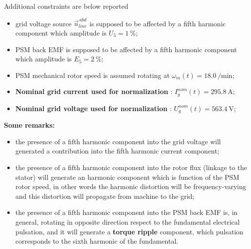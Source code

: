\documentclass[12pt,a4paper]{scrartcl}
\begin{document}
\begin{onehalfspace}
Additional constraints are below reported
\begin{itemize}
	\item[--] grid voltage source $\vec{u}_{line}^{\,abd}$ is supposed to be affected by a fifth harmonic component which amplitude is $U_{5}=\SI{1}{\percent}$;
	\item[--] PSM back EMF is supposed to be affected by a fifth harmonic component which amplitude is $E_{5}=\SI{2}{\percent}$;
	\item[--] PSM mechanical rotor speed is assumed rotating at $\omega_m(t) = \SI{18.0}{\per\minute}$;	
	\item[--] \textbf{Nominal grid current used for normalization} : $I_{g}^{nom}(t) = \SI{295.8}{\ampere}$;	
	\item[--] \textbf{Nominal grid voltage used for normalization} : $U_{g}^{nom}(t) = \SI{563.4}{\volt}$;	
\end{itemize} 

\noindent\textbf{Some remarks:}
\begin{itemize}
	\item[--] the presence of a fifth harmonic component into the grid voltage will generated a contribution into the fifth harmonic current component;
	\item[--] the presence of a fifth harmonic component into the rotor flux (linkage to the stator) will generate an harmonic component which is function of the PSM rotor speed, in other words the harmonic distortion will be frequency-varying and this distortion will propagate from machine to the grid;
	\item[--] the presence of a fifth harmonic component into the PSM back EMF is, in general, rotating in opposite direction respect to the fundamental electrical pulsation, and it will generate a \textbf{torque ripple} component, which pulsation corresponds to the sixth harmonic of the fundamental.
\end{itemize}


\end{onehalfspace}
\end{document}

